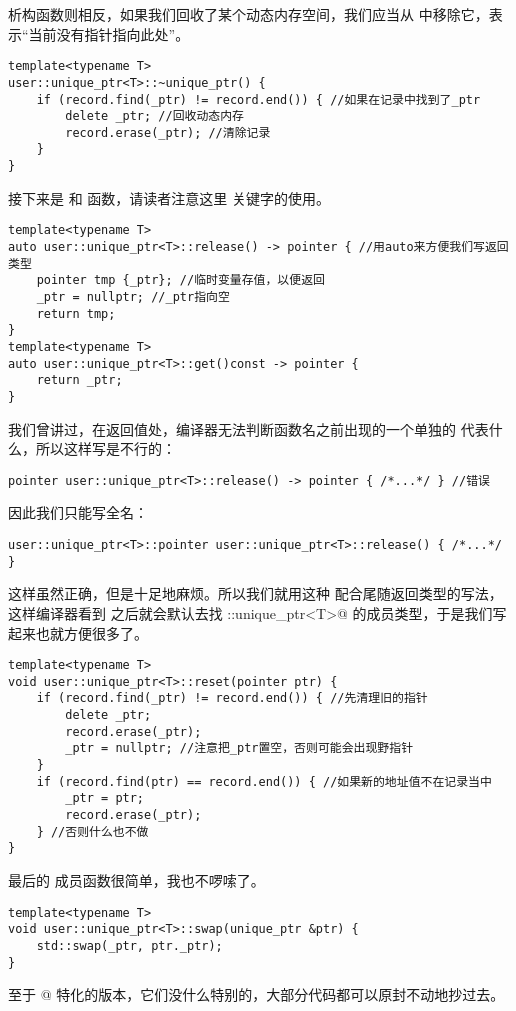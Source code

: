 析构函数则相反，如果我们回收了某个动态内存空间，我们应当从 \lstinline@record@ 中移除它，表示``当前没有指针指向此处''。
\begin{lstlisting}
template<typename T>
user::unique_ptr<T>::~unique_ptr() {
    if (record.find(_ptr) != record.end()) { //如果在记录中找到了_ptr
        delete _ptr; //回收动态内存
        record.erase(_ptr); //清除记录
    }
}
\end{lstlisting}
接下来是 \lstinline@release@ 和 \lstinline@get@ 函数，请读者注意这里 \lstinline@auto@ 关键字的使用。
\begin{lstlisting}
template<typename T>
auto user::unique_ptr<T>::release() -> pointer { //用auto来方便我们写返回类型
    pointer tmp {_ptr}; //临时变量存值，以便返回
    _ptr = nullptr; //_ptr指向空
    return tmp;
}
template<typename T>
auto user::unique_ptr<T>::get()const -> pointer {
    return _ptr;
}
\end{lstlisting}
我们曾讲过，在返回值处，编译器无法判断函数名之前出现的一个单独的 \lstinline@pointer@ 代表什么，所以这样写是不行的：
\begin{lstlisting}
pointer user::unique_ptr<T>::release() -> pointer { /*...*/ } //错误
\end{lstlisting}
因此我们只能写全名：
\begin{lstlisting}
user::unique_ptr<T>::pointer user::unique_ptr<T>::release() { /*...*/ }
\end{lstlisting}
这样虽然正确，但是十足地麻烦。所以我们就用这种 \lstinline@auto@ 配合尾随返回类型的写法，这样编译器看到 \lstinline@pointer@ 之后就会默认去找 \lstinline@user::unique_ptr<T>@ 的成员类型，于是我们写起来也就方便很多了。\par
\begin{lstlisting}
template<typename T>
void user::unique_ptr<T>::reset(pointer ptr) {
    if (record.find(_ptr) != record.end()) { //先清理旧的指针
        delete _ptr;
        record.erase(_ptr);
        _ptr = nullptr; //注意把_ptr置空，否则可能会出现野指针
    }
    if (record.find(ptr) == record.end()) { //如果新的地址值不在记录当中
        _ptr = ptr;
        record.erase(_ptr);
    } //否则什么也不做
}
\end{lstlisting}\par
最后的 \lstinline@swap@ 成员函数很简单，我也不啰嗦了。
\begin{lstlisting}
template<typename T>
void user::unique_ptr<T>::swap(unique_ptr &ptr) {
    std::swap(_ptr, ptr._ptr);
}
\end{lstlisting}\par
至于 \lstinline@T[]@ 特化的版本，它们没什么特别的，大部分代码都可以原封不动地抄过去。
